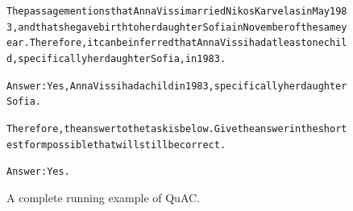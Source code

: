 \begin{figure}[t]
{{\begin{alltt}
The passage mentions that Anna Vissi married Nikos Karvelas in May 1983, and that she gave birth to her daughter Sofia in November of the same year. Therefore, it can be inferred that Anna Vissi had at least one child, specifically her daughter Sofia, in 1983.

Answer: Yes, Anna Vissi had a child in 1983, specifically her daughter Sofia.

Therefore, the answer to the task is below. Give the answer in the shortest form possible that will still be correct.

Answer: Yes.
\end{alltt}
}}
\caption{A complete running example of QuAC.}
\label{fig:quac_example}
\end{figure}
